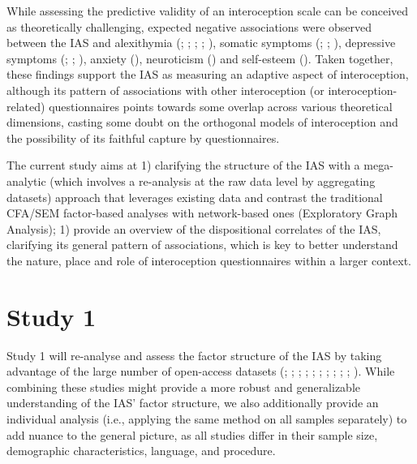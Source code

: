 \documentclass[
  jou,
  floatsintext,
  longtable,
  nolmodern,
  notxfonts,
  notimes,
  colorlinks=true,linkcolor=blue,citecolor=blue,urlcolor=blue]{apa7}
\begin{document}
While assessing the predictive validity of an interoception scale can be
conceived as theoretically challenging, expected negative associations
were observed between the IAS and alexithymia
(;
;
;
;
), somatic symptoms
(;
;
), depressive symptoms
(;
;
), anxiety
(), neuroticism
() and self-esteem
(). Taken together, these
findings support the IAS as measuring an adaptive aspect of
interoception, although its pattern of associations with other
interoception (or interoception-related) questionnaires points towards
some overlap across various theoretical dimensions, casting some doubt
on the orthogonal models of interoception and the possibility of its
faithful capture by questionnaires.

The current study aims at 1) clarifying the structure of the IAS with a
mega-analytic (which involves a re-analysis at the raw data level by
aggregating datasets) approach that leverages existing data and contrast
the traditional CFA/SEM factor-based analyses with network-based ones
(Exploratory Graph Analysis); 1) provide an overview of the
dispositional correlates of the IAS, clarifying its general pattern of
associations, which is key to better understand the nature, place and
role of interoception questionnaires within a larger context.

\section{Study 1}\label{study-1}

Study 1 will re-analyse and assess the factor structure of the IAS by
taking advantage of the large number of open-access datasets
(;
;
;
;
;
;
;
;
;
; ). While combining these studies might provide a more
robust and generalizable understanding of the IAS' factor structure, we
also additionally provide an individual analysis (i.e., applying the
same method on all samples separately) to add nuance to the general
picture, as all studies differ in their sample size, demographic
characteristics, language, and procedure.
\end{document}
